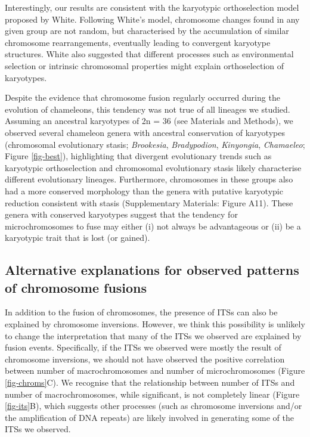 \documentclass[a4paper, 12pt]{article}
\begin{document}
Interestingly, our results are consistent with the karyotypic orthoselection model proposed by White\cite{white1973,white1975chromosome}. 
Following White's model, chromosome changes found in any given group are not random, but characterised by the accumulation of similar chromosome rearrangements, eventually leading to convergent karyotype structures\cite{white1973,white1975chromosome}. 
White also suggested that different processes such as environmental selection or intrinsic chromosomal properties might explain orthoselection of karyotypes\cite{white1973,white1975chromosome}.

Despite the evidence that chromosome fusion regularly occurred during the evolution of chameleons, this tendency was not true of all lineages we studied. Assuming an ancestral karyotypes of 2n = 36\cite{rovatsos2017evolution} (see Materials and Methods), we observed several chameleon genera with ancestral conservation of karyotypes (chromosomal evolutionary stasis; \textit{Brookesia}, \textit{Bradypodion}, \textit{Kinyongia}, \textit{Chamaeleo}; Figure \ref{fig-best}), highlighting that divergent evolutionary trends such as karyotypic orthoselection and chromosomal evolutionary stasis likely characterise different evolutionary lineages. 
Furthermore, chromosomes in these groups also had a more conserved morphology than the genera with putative karyotypic reduction consistent with stasis (Supplementary Materials: Figure A11). 
These genera with conserved karyotypes suggest that the tendency for microchromosomes to fuse may either (i) not always be advantageous or (ii) be a karyotypic trait that is lost (or gained). 

\subsection{Alternative explanations for observed patterns of chromosome fusions}
In addition to the fusion of chromosomes, the presence of ITSs can also be explained by chromosome inversions\cite{bolzan2017interstitial}. 
However, we think this possibility is unlikely to change the interpretation that many of the ITSs we observed are explained by fusion events. 
Specifically, if the ITSs we observed were mostly the result of chromosome inversions, we should not have observed the positive correlation between number of macrochromosomes and number of microchromosomes (Figure \ref{fig-chroms}C). 
We recognise that the relationship between number of ITSs and number of macrochromosomes, while significant, is not completely linear (Figure \ref{fig-its}B), which suggests other processes (such as chromosome inversions and/or the amplification of DNA repeats) are likely involved in generating some of the ITSs we observed.
\end{document}
